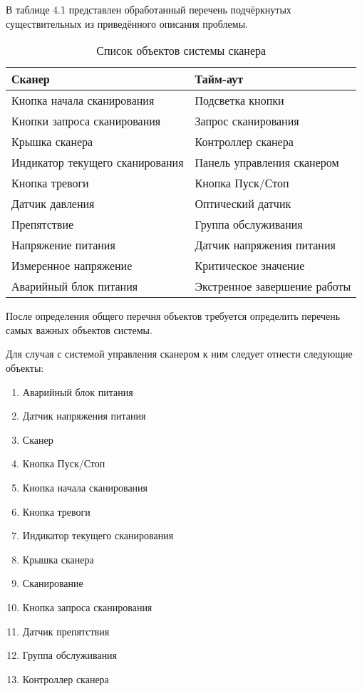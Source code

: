 \documentclass[12pt]{article}
\begin{document}
    В таблице 4.1 представлен обработанный перечень подчёркнутых существительных из приведённого описания проблемы.

    \begin{table}[h!]
        \centering
        \begin{tabulary}{\textwidth}{|L|L|}
            \hline
            Сканер & Тайм-аут \\
            \hline
            Кнопка начала сканирования & Подсветка кнопки \\
            \hline
            Кнопки запроса сканирования & Запрос сканирования \\
            \hline
            Крышка сканера & Контроллер сканера  \\
            \hline
            Индикатор текущего сканирования & Панель управления сканером \\
            \hline
            Кнопка тревоги & Кнопка Пуск/Стоп \\
            \hline
            Датчик давления & Оптический датчик  \\
            \hline
            Препятствие & Группа обслуживания  \\
            \hline
            Напряжение питания & Датчик напряжения питания  \\
            \hline
            Измеренное напряжение & Критическое значение \\
            \hline
            Аварийный блок питания & Экстренное завершение работы \\
            \hline
        \end{tabulary}
        \caption{Список объектов системы сканера}
    \end{table}

    После определения общего перечня объектов требуется определить перечень самых важных объектов системы.

    \newpage

    Для случая с системой управления сканером к ним следует отнести следующие объекты:
    \begin{enumerate}
        \item Аварийный блок питания
        \item Датчик напряжения питания
        \item Сканер
        \item Кнопка Пуск/Стоп
        \item Кнопка начала сканирования
        \item Кнопка тревоги
        \item Индикатор текущего сканирования
        \item Крышка сканера
        \item Сканирование
        \item Кнопка запроса сканирования
        \item Датчик препятствия
        \item Группа обслуживания
        \item Контроллер сканера
    \end{enumerate}
\end{document}
